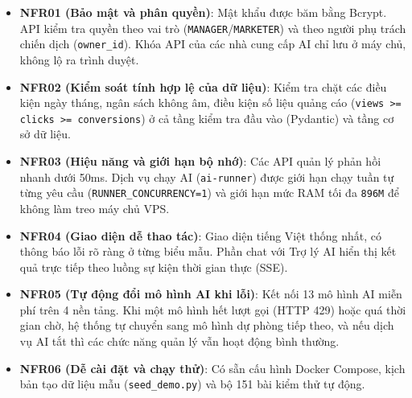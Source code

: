 \begin{itemize}[noitemsep,topsep=2pt]
 \item \textbf{NFR01 (Bảo mật và phân quyền)}: Mật khẩu được băm bằng Bcrypt. API kiểm tra quyền theo vai trò (\texttt{MANAGER}/\texttt{MARKETER}) và theo người phụ trách chiến dịch (\texttt{owner\_id}). Khóa API của các nhà cung cấp AI chỉ lưu ở máy chủ, không lộ ra trình duyệt.
 \item \textbf{NFR02 (Kiểm soát tính hợp lệ của dữ liệu)}: Kiểm tra chặt các điều kiện ngày tháng, ngân sách không âm, điều kiện số liệu quảng cáo (\texttt{views >= clicks >= conversions}) ở cả tầng kiểm tra đầu vào (Pydantic) và tầng cơ sở dữ liệu.
 \item \textbf{NFR03 (Hiệu năng và giới hạn bộ nhớ)}: Các API quản lý phản hồi nhanh dưới 50ms. Dịch vụ chạy AI (\texttt{ai-runner}) được giới hạn chạy tuần tự từng yêu cầu (\texttt{RUNNER\_CONCURRENCY=1}) và giới hạn mức RAM tối đa \texttt{896M} để không làm treo máy chủ VPS.
 \item \textbf{NFR04 (Giao diện dễ thao tác)}: Giao diện tiếng Việt thống nhất, có thông báo lỗi rõ ràng ở từng biểu mẫu. Phần chat với Trợ lý AI hiển thị kết quả trực tiếp theo luồng sự kiện thời gian thực (SSE).
 \item \textbf{NFR05 (Tự động đổi mô hình AI khi lỗi)}: Kết nối 13 mô hình AI miễn phí trên 4 nền tảng. Khi một mô hình hết lượt gọi (HTTP 429) hoặc quá thời gian chờ, hệ thống tự chuyển sang mô hình dự phòng tiếp theo, và nếu dịch vụ AI tắt thì các chức năng quản lý vẫn hoạt động bình thường.
 \item \textbf{NFR06 (Dễ cài đặt và chạy thử)}: Có sẵn cấu hình Docker Compose, kịch bản tạo dữ liệu mẫu (\texttt{seed\_demo.py}) và bộ 151 bài kiểm thử tự động.
\end{itemize}
